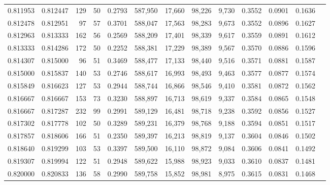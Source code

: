 \begin{tabular}{rrrrrrrrrrrrr}
0.811953 & 0.812447 &    129 &    50 &                                     0.2793 & 587,950 &  17,660 &  98,226 &   9,730 & 0.3552 & 0.0901 & 0.1636 \\
0.812478 & 0.812951 &     97 &    57 &                                     0.3701 & 588,047 &  17,563 &  98,283 &   9,673 & 0.3552 & 0.0896 & 0.1627 \\
0.812963 & 0.813333 &    162 &    56 &                                     0.2569 & 588,209 &  17,401 &  98,339 &   9,617 & 0.3559 & 0.0891 & 0.1612 \\
0.813333 & 0.814286 &    172 &    50 &                                     0.2252 & 588,381 &  17,229 &  98,389 &   9,567 & 0.3570 & 0.0886 & 0.1596 \\
0.814307 & 0.815000 &     96 &    51 &                                     0.3469 & 588,477 &  17,133 &  98,440 &   9,516 & 0.3571 & 0.0881 & 0.1587 \\
0.815000 & 0.815837 &    140 &    53 &                                     0.2746 & 588,617 &  16,993 &  98,493 &   9,463 & 0.3577 & 0.0877 & 0.1574 \\
0.815849 & 0.816623 &    127 &    53 &                                     0.2944 & 588,744 &  16,866 &  98,546 &   9,410 & 0.3581 & 0.0872 & 0.1562 \\
0.816667 & 0.816667 &    153 &    73 &                                     0.3230 & 588,897 &  16,713 &  98,619 &   9,337 & 0.3584 & 0.0865 & 0.1548 \\
0.816667 & 0.817287 &    232 &    99 &                                     0.2991 & 589,129 &  16,481 &  98,718 &   9,238 & 0.3592 & 0.0856 & 0.1527 \\
0.817302 & 0.817778 &    102 &    50 &                                     0.3289 & 589,231 &  16,379 &  98,768 &   9,188 & 0.3594 & 0.0851 & 0.1517 \\
0.817857 & 0.818606 &    166 &    51 &                                     0.2350 & 589,397 &  16,213 &  98,819 &   9,137 & 0.3604 & 0.0846 & 0.1502 \\
0.818640 & 0.819299 &    103 &    53 &                                     0.3397 & 589,500 &  16,110 &  98,872 &   9,084 & 0.3606 & 0.0841 & 0.1492 \\
0.819307 & 0.819994 &    122 &    51 &                                     0.2948 & 589,622 &  15,988 &  98,923 &   9,033 & 0.3610 & 0.0837 & 0.1481 \\
0.820000 & 0.820833 &    136 &    58 &                                     0.2990 & 589,758 &  15,852 &  98,981 &   8,975 & 0.3615 & 0.0831 & 0.1468 \\

\end{tabular}
